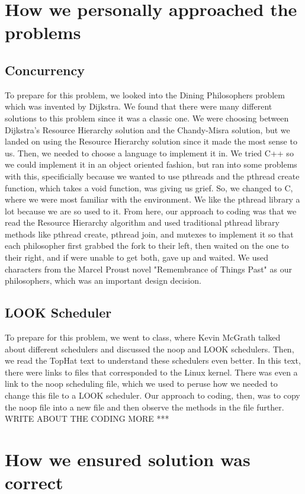 \documentclass[letterpaper,10pt,titlepage]{article}
\begin{document}
\section{How we personally approached the problems}
\subsection{Concurrency}
To prepare for this problem, we looked into the Dining Philosophers problem which was invented by Dijkstra. We found that there were many different solutions to this problem since it was a classic one. We were choosing between Dijkstra's Resource Hierarchy solution and the Chandy-Misra solution, but we landed on using the Resource Hierarchy solution since it made the most sense to us. Then, we needed to choose a language to implement it in. We tried C++ so we could implement it in an object oriented fashion, but ran into some problems with this, specificially because we wanted to use pthreads and the pthread create function, which takes a void function, was giving us grief. So, we changed to C, where we were most familiar with the environment. We like the pthread library a lot because we are so used to it. From here, our approach to coding was that we read the Resource Hierarchy algorithm and used traditional pthread library methods like pthread create, pthread join, and mutexes to implement it so that each philosopher first grabbed the fork to their left, then waited on the one to their right, and if were unable to get both, gave up and waited. We used characters from the Marcel Proust novel "Remembrance of Things Past" as our philosophers, which was an important design decision.

\subsection{LOOK Scheduler}
To prepare for this problem, we went to class, where Kevin McGrath talked about different schedulers and discussed the noop and LOOK schedulers. Then, we read the TopHat text to understand these schedulers even better. In this text, there were links to files that corresponded to the Linux kernel. There was even a link to the noop scheduling file, which we used to peruse how we needed to change this file to a LOOK scheduler. Our approach to coding, then, was to copy the noop file into a new file and then observe the methods in the file further. WRITE ABOUT THE CODING MORE ***

\section{How we ensured solution was correct}
\end{document}

